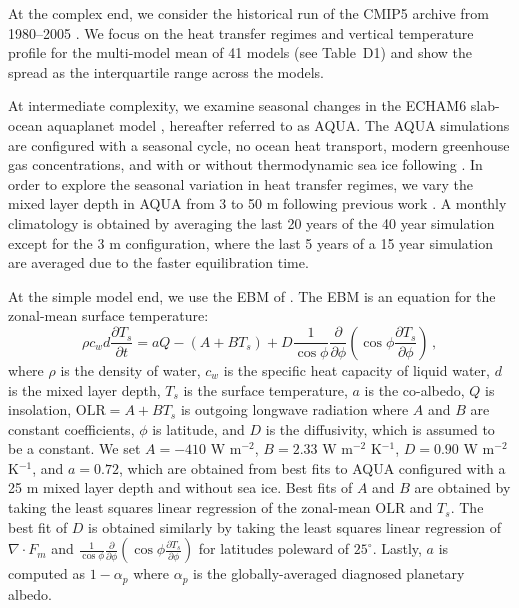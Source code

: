 \documentclass{ametsocV5}
\begin{document}
    At the complex end, we consider the historical run of the CMIP5 archive from 1980--2005 \citep{taylor2012}. We focus on the heat transfer regimes and vertical temperature profile for the multi-model mean of 41 models (see Table~D1) and show the spread as the interquartile range across the models.

    At intermediate complexity, we examine seasonal changes in the ECHAM6 slab-ocean aquaplanet model \citep{stevens2013}, hereafter referred to as AQUA. The AQUA simulations are configured with a seasonal cycle, no ocean heat transport, modern greenhouse gas concentrations, and with or without thermodynamic sea ice following \cite{shaw2020}. In order to explore the seasonal variation in heat transfer regimes, we vary the mixed layer depth in AQUA from 3 to 50 m following previous work \citep{donohoe2013, barpanda2020}. A monthly climatology is obtained by averaging the last 20 years of the 40 year simulation except for the 3 m configuration, where the last 5 years of a 15 year simulation are averaged due to the faster equilibration time.

    At the simple model end, we use the EBM of \cite{rose2017}. The EBM is an equation for the zonal-mean surface temperature:
    \begin{equation}
      \rho c_w d \frac{\partial T_s}{\partial t} = aQ - (A+BT_s)  + D \frac{1}{\cos\phi}\frac{\partial}{\partial \phi}\left( \cos\phi \frac{\partial T_s}{\partial \phi} \right)\, ,
    \end{equation}
    where $\rho$ is the density of water, $c_w$ is the specific heat capacity of liquid water, $d$ is the mixed layer depth, $T_s$ is the surface temperature, $a$ is the co-albedo, $Q$ is insolation, $\mathrm{OLR}=A+BT_s$ is outgoing longwave radiation where $A$ and $B$ are constant coefficients, $\phi$ is latitude, and $D$ is the diffusivity, which is assumed to be a constant. We set $A=-410$ W m$^{-2}$, $B=2.33$ W m$^{-2}$ K$^{-1}$, $D=0.90$ W m$^{-2}$ K$^{-1}$, and $a=0.72$, which are obtained from best fits to AQUA configured with a 25 m mixed layer depth and without sea ice. Best fits of $A$ and $B$ are obtained by taking the least squares linear regression of the zonal-mean $\mathrm{OLR}$ and $T_s$. The best fit of $D$ is obtained similarly by taking the least squares linear regression of $\nabla\cdot F_m$ and $\frac{1}{\cos\phi}\frac{\partial}{\partial \phi} \left( \cos\phi \frac{\partial T_s}{\partial \phi} \right)$ for latitudes poleward of $25^\circ$. Lastly, $a$ is computed as $1-\alpha_p$ where $\alpha_p$ is the globally-averaged diagnosed planetary albedo.
\end{document}
